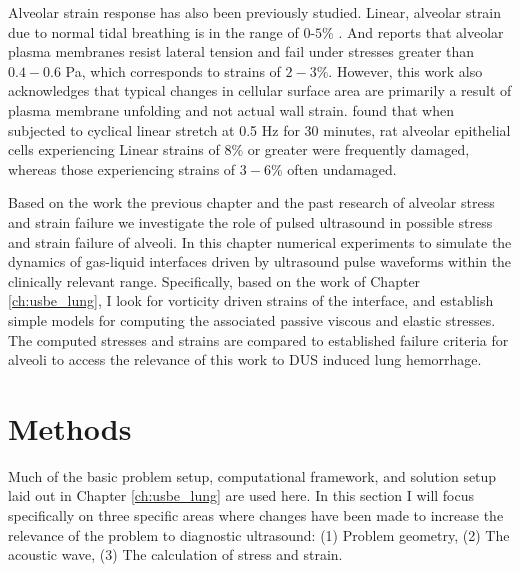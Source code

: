 Alveolar strain response has also been previously studied. Linear,
alveolar strain due to normal tidal breathing is in the range of
$0$-$5$\% \citep{Roan2011}. And \cite{Vlahakis2000} reports that
alveolar plasma membranes resist lateral tension and fail under
stresses greater than $0.4-0.6$ Pa, which corresponds to strains of
$2-3\%$. However, this work also acknowledges that typical changes in
cellular surface area are primarily a result of plasma membrane
unfolding and not actual wall strain. \citep{Belete2010} found that
when subjected to cyclical linear stretch at 0.5 Hz for 30 minutes,
rat alveolar epithelial cells experiencing Linear strains of $8\%$ or
greater were frequently damaged, whereas those experiencing strains
of $3 - 6\%$ often undamaged. 

Based on the work the previous chapter and the past research of
alveolar stress and strain failure we investigate the role of pulsed
ultrasound in possible stress and strain failure of alveoli. In this
chapter numerical experiments to simulate the dynamics of gas-liquid
interfaces driven by ultrasound pulse waveforms within the clinically
relevant range. Specifically, based on the work of Chapter
\ref{ch:usbe_lung}, I look for vorticity driven strains of the
interface, and establish simple models for computing the associated
passive viscous and elastic stresses. The computed stresses and
strains are compared to established failure criteria for alveoli to
access the relevance of this work to \ac{DUS} induced lung hemorrhage.


\section{Methods}
Much of the basic problem setup, computational framework, and solution
setup laid out in Chapter \ref{ch:usbe_lung} are used here. In this
section I will focus specifically on three specific areas where
changes have been made to increase the relevance of the problem to
diagnostic ultrasound: (1) Problem geometry, (2) The acoustic wave,
(3) The calculation of stress and strain.

